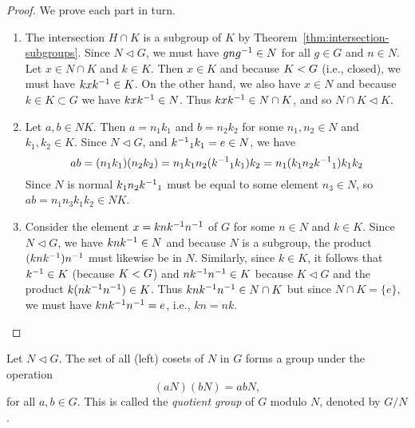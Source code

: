 \begin{proof}
    We prove each part in turn.
    \begin{enumerate}[label=(\alph*), wide]
        \item The intersection \(H \cap K\) is a subgroup of \(K\) by
        Theorem~\ref{thm:intersection-subgroups}. Since \(N \triangleleft G\),
        we must have \(gng^{-1} \in N\) for all \(g \in G\) and \(n \in N\). Let
        \(x \in N \cap K\) and \(k \in K\). Then \(x \in K\) and because \(K
        < G\) (i.e., closed), we must have \(kxk^{-1} \in K\). On the
        other hand, we also have \(x \in N\) and because \(k \in K \subset G\)
        we have \(kxk^{-1} \in N\). Thus \(kxk^{-1} \in N \cap K\), and so \(N
        \cap K \triangleleft K\).
        
        \item Let \(a, b \in NK\). Then \(a = n_1k_1\) and \(b = n_2k_2\) for
        some \(n_1, n_2 \in N\) and \(k_1, k_2 \in K\). Since \(N \triangleleft
        G\), and \({k^{-1}}_1k_1 = e \in N\), we have
        \[
            ab = (n_1k_1)(n_2k_2) = n_1k_1n_2({k^{-1}}_1k_1)k_2 = n_1(k_1n_2{k^{-1}}_1)k_1k_2
        \]
        Since \(N\) is normal \(k_1n_2{k^{-1}}_1\) must be equal to some element
        \(n_3 \in N\), so \(ab = n_1n_3k_1k_2 \in NK\).
        \item Consider the element \(x = knk^{-1} n^{-1}\) of \(G\) for some \(n
        \in N\) and \(k \in K\). Since \(N \triangleleft G\), we have \(knk^{-1}
        \in N\) and because \(N\) is a subgroup, the product \((knk^{-1})n^{-1}\)
        must likewise be in \(N\). Similarly, since \(k \in K\), it follows that
        \(k^{-1} \in K\) (because \(K < G\)) and \(nk^{-1} n^{-1} \in K\)
        because \(K \triangleleft G\) and the product \(k(nk^{-1} n^{-1}) \in K\).
        Thus \(knk^{-1} n^{-1} \in N \cap K\) but since \(N \cap K = \{e\}\), we
        must have \(knk^{-1} n^{-1} = e\), i.e., \(kn = nk\).
    \end{enumerate}
\end{proof}

\begin{theorem}
    \label{thm:quotient-group}
    Let \(N \triangleleft G\). The set of all (left) cosets of \(N\) in \(G\)
    forms a group under the operation
    \[
        (aN)(bN) = abN,
    \]
    for all \(a, b \in G\). This is called the \emph{quotient group} of \(G\)
    modulo \(N\), denoted by \(G/N\).
\end{theorem}

